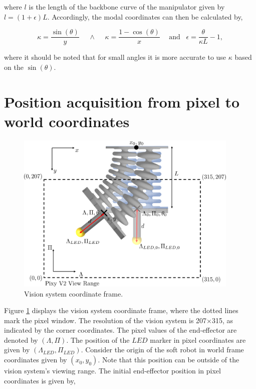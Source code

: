 where $l$ is the length of the backbone curve of the manipulator given by $l = (1+\epsilon)L$. Accordingly, the modal coordinates can then be calculated by,

\begin{equation}
    \kappa = \frac{\sin(\theta)}{y} \hspace{15pt} 	\land \hspace{15pt}  \kappa = \frac{1 -\cos(\theta)}{x} \hspace{15pt} \text{and} \hspace{10pt} \epsilon = \frac{\theta}{\kappa L} -1,
\end{equation}

where it should be noted that for small angles it is more accurate to use $\kappa$ based on the $\sin(\theta)$.



\label{app:chap5}

\section{Position acquisition from pixel to world coordinates}

\begin{figure}[H]
    \centering
    \includegraphics[width = 0.95\textwidth]{Figures/Appendix5/pix2w.png}
    \caption{Vision system coordinate frame.}
    \label{figapp5:px2w}
\end{figure}


Figure \ref{figapp5:px2w} displays the vision system coordinate frame, where the dotted lines mark the pixel window. The resolution of the vision system is 207$\times$315, as indicated by the corner coordinates. The pixel values of the end-effector are denoted by $(\Lambda,\Pi)$. The position of the $LED$ marker in pixel coordinates are given by $(\Lambda_{LED},\Pi_{LED})$. Consider the origin of the soft robot in world frame coordinates given by $(x_0,y_0)$. Note that this position can be outside of the vision system's viewing range. The initial end-effector position in pixel coordinates is given by,


